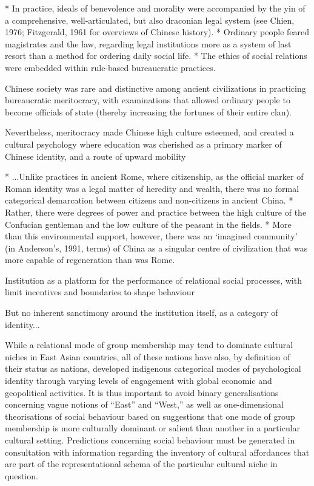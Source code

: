 {* In practice, ideals of benevolence and morality were accompanied by the yin of a comprehensive, well-articulated, but also draconian legal system (see Chien, 1976; Fitzgerald, 1961 for overviews of Chinese history).
* Ordinary people feared magistrates and the law, regarding legal institutions more as a system of last resort than a method for ordering daily social life.
* The ethics of social relations were embedded within rule-based bureaucratic practices.

Chinese society was rare and distinctive among ancient civilizations in practicing bureaucratic meritocracy, with examinations that allowed ordinary people to become officials of state (thereby increasing the fortunes of their entire clan).

Nevertheless, meritocracy made Chinese high culture esteemed, and created a cultural psychology where education was cherished as a primary marker of Chinese identity, and a route of upward mobility


* ...Unlike practices in ancient Rome, where citizenship, as the official marker of Roman identity was a legal matter of heredity and wealth, there was no formal categorical demarcation between citizens and non-citizens in ancient China.
* Rather, there were degrees of power and practice between the high culture of the Confucian gentleman and the low culture of the peasant in the fields.
* More than this environmental support, however, there was an ‘imagined community’ (in Anderson’s, 1991, terms) of China as a singular centre of civilization that was more capable of regeneration than was Rome.

Institution as a platform for the performance of relational social processes, with limit incentives and boundaries to shape behaviour

But no inherent sanctimony around the institution itself, as a category of identity...



While a relational mode of group membership may tend to dominate cultural niches in East Asian countries, all of these nations have also, by definition of their status as nations, developed indigenous categorical modes of psychological identity through varying levels of engagement with global economic and geopolitical activities. It is thus important to avoid binary generalisations concerning vague notions of ``East'' and ``West,'' as well as one-dimensional theorisations of social behaviour based on suggestions that one mode of group membership is more culturally dominant or salient than another in a particular cultural setting.  Predictions concerning social behaviour must be generated in consultation with information regarding the inventory of cultural affordances that are part of the representational schema of the particular cultural niche in question.


}
